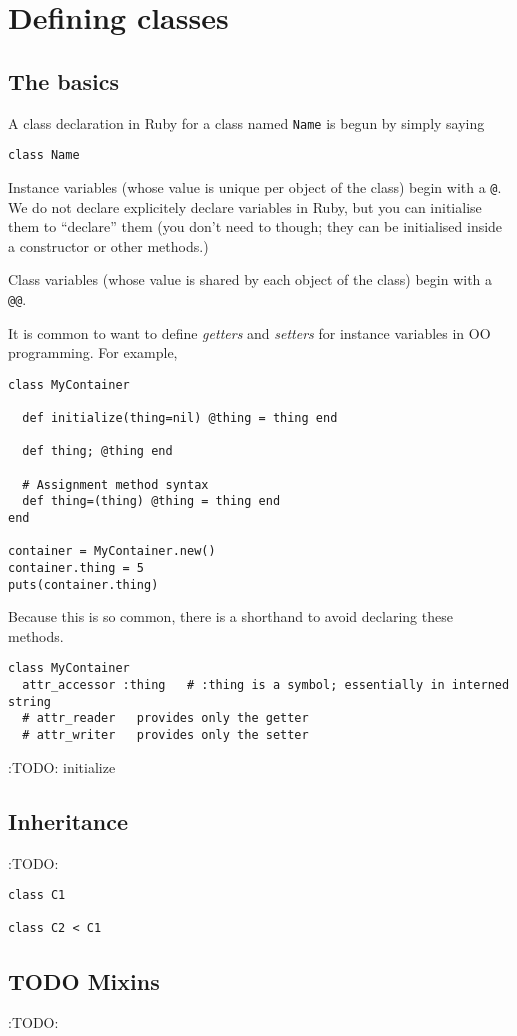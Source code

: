 \documentclass[11pt]{article}
\begin{document}
\section{Defining classes}
\label{sec:org0550c29}
\subsection{The basics}
\label{sec:org8ebb317}
A class declaration in Ruby for a class named \texttt{Name} is
begun by simply saying
\begin{verbatim}
class Name
\end{verbatim}

Instance variables
(whose value is unique per object of the class)
begin with a \texttt{@}.
We do not declare explicitely declare variables in Ruby,
but you can initialise them to “declare” them
(you don't need to though; they can be initialised inside
a constructor or other methods.)

Class variables
(whose value is shared by each object of the class)
begin with a \texttt{@@}.

It is common to want to define \emph{getters} and \emph{setters} for instance
variables in OO programming.
For example,
\begin{verbatim}
class MyContainer
  
  def initialize(thing=nil) @thing = thing end

  def thing; @thing end

  # Assignment method syntax
  def thing=(thing) @thing = thing end
end

container = MyContainer.new()
container.thing = 5
puts(container.thing)
\end{verbatim}

Because this is so common, there is a shorthand
to avoid declaring these methods.
\begin{verbatim}
class MyContainer
  attr_accessor :thing   # :thing is a symbol; essentially in interned string
  # attr_reader   provides only the getter
  # attr_writer   provides only the setter
\end{verbatim}

:TODO: initialize

\subsection{Inheritance}
\label{sec:org83d12ad}
:TODO:

\begin{verbatim}
class C1

class C2 < C1
\end{verbatim}

\subsection{{\bfseries\sffamily TODO} Mixins}
\label{sec:orgb8ef083}
:TODO:
\end{document}
